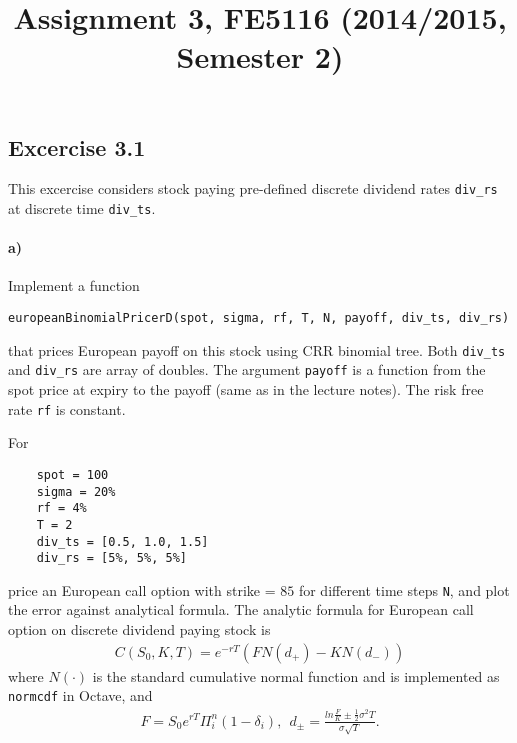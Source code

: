\documentclass[12pt,a4paper,hidelinks,fleqn]{article}            %
\title{\vspace{-5ex}Assignment 3, FE5116 (2014/2015, Semester 2)\vspace{-7ex}}
\date{}
\begin{document}
\maketitle

\subsection*{Excercise 3.1}
 
This excercise considers stock paying pre-defined discrete dividend rates \verb=div_rs= at discrete time \verb=div_ts=. 
\vspace{-1cm}
\paragraph{a)} Implement a function 
\vspace{-5mm}
\begin{verbatim}
europeanBinomialPricerD(spot, sigma, rf, T, N, payoff, div_ts, div_rs)
\end{verbatim}
\vspace{-5mm}
that prices European payoff on this stock using CRR binomial tree. Both \verb=div_ts= and \verb=div_rs= are array of doubles.
The argument \verb=payoff= is a function from the spot price at expiry to the payoff (same as in the lecture notes). The risk free rate \verb=rf= is constant.

For 
\vspace{-1cm} 
\begin{verbatim}
    spot = 100
    sigma = 20%
    rf = 4%
    T = 2
    div_ts = [0.5, 1.0, 1.5]
    div_rs = [5%, 5%, 5%]
\end{verbatim} 
price an European call option with strike = $85$ for different time steps \verb=N=,
and plot the error against analytical formula. The analytic formula for European call option on discrete dividend paying stock is
\begin{align*}
C(S_0, K, T) = e^{-rT} (F N(d_+) - K N(d_-))
\end{align*}
where $N(\cdot)$ is the standard cumulative normal function and is implemented as \verb=normcdf= in Octave, and
\begin{align*}
F = S_0 e^{rT} \Pi_i^n (1-\delta_i), ~~
d_{\pm} = \frac{ln\frac{F}{K}  \pm \frac{1}{2}\sigma^2T}{\sigma\sqrt{T}}.
\end{align*}

\vspace{-1cm}
\end{document}
